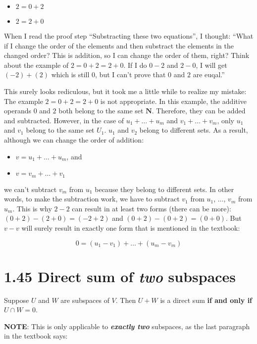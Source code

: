 \documentclass[12pt, letterpaper, oneside]{book}
\begin{document}
\begin{itemize}
  \item $2 = 0 + 2$
  \item $2 = 2 + 0$
\end{itemize}

When I read the proof step ``Substracting these two equations'', I thought:
``What if I change the order of the elements and then substract the elements in
the changed order? This is addition, so I can change the order of them, right?
Think about the example of $2 = 0 + 2 = 2 + 0$. If I do $0 - 2$ and $2 - 0$, I
will get $(-2) + (2)$ which is still $0$, but I can't prove that $0$ and $2$
are euqal.''

This surely looks rediculous, but it took me a little while to realize my
mistake: The example $2 = 0 + 2 = 2 + 0$ is not appropriate. In this example,
the additive operands $0$ and $2$ both belong to the same set $\mathbf{N}$.
Therefore, they can be added and subtracted. However, in the case of $u_1 +
\ldots + u_m$ and $v_1 + \ldots + v_m$, only $u_1$ and $v_1$ belong to the same
set $U_1$. $u_1$ and $v_2$ belong to different sets. As a result, although we
can change the order of addition:

\begin{itemize}
  \item $v = u_1 + \ldots + u_m$, and
  \item $v = v_m + \ldots + v_1$
\end{itemize}

we can't subtract $v_m$ from $u_1$ because they belong to different sets. In
other words, to make the subtraction work, we have to subtract $v_1$ from $u_1$,
$\ldots$, $v_m$ from $u_m$. This is why $2 - 2$ can result in at least two
forms (there can be more): $(0 + 2) - (2 + 0) = (-2 + 2)$ and $(0 + 2) -
(0 + 2) = (0 + 0)$. But $v - v$ will surely result in exactly one form that is
mentioned in the textbook:

\[
  0 = (u_1 - v_1) + \ldots + (u_m - v_m)
\]

\section{1.45 Direct sum of \textbf{\textit{two}} subspaces}

Suppose $U$ and $W$ are subspaces of $V$. Then $U + W$ is a direct sum
\textbf{if and only if} $U \cap W = {0}$.

\textbf{NOTE}: This is only applicable to \textbf{\textit{exactly two}}
subspaces, as the last paragraph in the textbook says:
\end{document}
